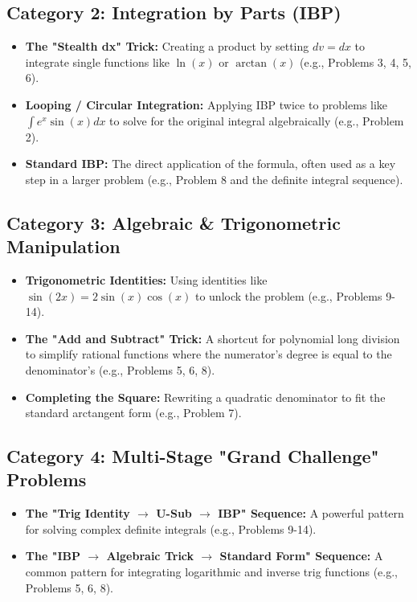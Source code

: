 \documentclass{article}
\begin{document}
\subsection*{Category 2: Integration by Parts (IBP)}
\begin{itemize}
    \item \textbf{The "Stealth dx" Trick:} Creating a product by setting $dv=dx$ to integrate single functions like $\ln(x)$ or $\arctan(x)$ (e.g., Problems 3, 4, 5, 6).
    \item \textbf{Looping / Circular Integration:} Applying IBP twice to problems like $ \int e^x\sin(x)dx $ to solve for the original integral algebraically (e.g., Problem 2).
    \item \textbf{Standard IBP:} The direct application of the formula, often used as a key step in a larger problem (e.g., Problem 8 and the definite integral sequence).
\end{itemize}

\subsection*{Category 3: Algebraic \& Trigonometric Manipulation}
\begin{itemize}
    \item \textbf{Trigonometric Identities:} Using identities like $ \sin(2x) = 2\sin(x)\cos(x) $ to unlock the problem (e.g., Problems 9-14).
    \item \textbf{The "Add and Subtract" Trick:} A shortcut for polynomial long division to simplify rational functions where the numerator's degree is equal to the denominator's (e.g., Problems 5, 6, 8).
    \item \textbf{Completing the Square:} Rewriting a quadratic denominator to fit the standard arctangent form (e.g., Problem 7).
\end{itemize}

\subsection*{Category 4: Multi-Stage "Grand Challenge" Problems}
\begin{itemize}
    \item \textbf{The "Trig Identity $\to$ U-Sub $\to$ IBP" Sequence:} A powerful pattern for solving complex definite integrals (e.g., Problems 9-14).
    \item \textbf{The "IBP $\to$ Algebraic Trick $\to$ Standard Form" Sequence:} A common pattern for integrating logarithmic and inverse trig functions (e.g., Problems 5, 6, 8).
\end{itemize}
\end{document}
